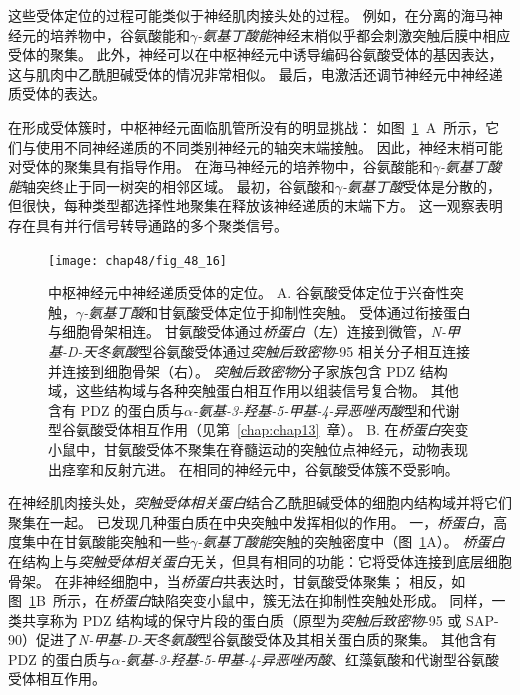 这些受体定位的过程可能类似于神经肌肉接头处的过程。
例如，在分离的海马神经元的培养物中，谷氨酸能和\textit{$ \gamma $-氨基丁酸能}神经末梢似乎都会刺激突触后膜中相应受体的聚集。
此外，神经可以在中枢神经元中诱导编码谷氨酸受体的基因表达，这与肌肉中乙酰胆碱受体的情况非常相似。
最后，电激活还调节神经元中神经递质受体的表达。


在形成受体簇时，中枢神经元面临肌管所没有的明显挑战：
如图~\ref{fig:48_16}~A~所示，它们与使用不同神经递质的不同类别神经元的轴突末端接触。
因此，神经末梢可能对受体的聚集具有指导作用。
在海马神经元的培养物中，谷氨酸能和\textit{$ \gamma $-氨基丁酸能}轴突终止于同一树突的相邻区域。
最初，谷氨酸和\textit{$ \gamma $-氨基丁酸}受体是分散的，但很快，每种类型都选择性地聚集在释放该神经递质的末端下方。
这一观察表明存在具有并行信号转导通路的多个聚类信号。


\begin{figure}[htbp]
	\centering
	\texttt{[image: chap48/fig\_48\_16]}
	\caption{中枢神经元中神经递质受体的定位。
		A. 谷氨酸受体定位于兴奋性突触，\textit{$ \gamma $-氨基丁酸}和甘氨酸受体定位于抑制性突触。
		受体通过衔接蛋白与细胞骨架相连。
		甘氨酸受体通过\textit{桥蛋白}（左）连接到微管，\textit{N-甲基-D-天冬氨酸}型谷氨酸受体通过\textit{突触后致密物}-95 相关分子相互连接并连接到细胞骨架（右）。
		\textit{突触后致密物}分子家族包含 PDZ 结构域，这些结构域与各种突触蛋白相互作用以组装信号复合物。
		其他含有 PDZ 的蛋白质与\textit{$\alpha$-氨基-3-羟基-5-甲基-4-异恶唑丙酸}型和代谢型谷氨酸受体相互作用（见第~\ref{chap:chap13}~章）。
		B. 在\textit{桥蛋白}突变小鼠中，甘氨酸受体不聚集在脊髓运动的突触位点神经元，动物表现出痉挛和反射亢进。
		在相同的神经元中，谷氨酸受体簇不受影响\cite{feng1998dual}。}
	\label{fig:48_16}
\end{figure}


在神经肌肉接头处，\textit{突触受体相关蛋白}结合乙酰胆碱受体的细胞内结构域并将它们聚集在一起。
已发现几种蛋白质在中央突触中发挥相似的作用。
一，\textit{桥蛋白}，高度集中在甘氨酸能突触和一些\textit{$ \gamma $-氨基丁酸能}突触的突触密度中（图~\ref{fig:48_16}A）。
\textit{桥蛋白}在结构上与\textit{突触受体相关蛋白}无关，但具有相同的功能：它将受体连接到底层细胞骨架。
在非神经细胞中，当\textit{桥蛋白}共表达时，甘氨酸受体聚集；
相反，如图~\ref{fig:48_16}B~所示，在\textit{桥蛋白}缺陷突变小鼠中，簇无法在抑制性突触处形成。
同样，一类共享称为 PDZ 结构域的保守片段的蛋白质（原型为\textit{突触后致密物}-95 或 SAP-90）促进了\textit{N-甲基-D-天冬氨酸}型谷氨酸受体及其相关蛋白质的聚集。
其他含有 PDZ 的蛋白质与\textit{$\alpha$-氨基-3-羟基-5-甲基-4-异恶唑丙酸}、红藻氨酸和代谢型谷氨酸受体相互作用。




